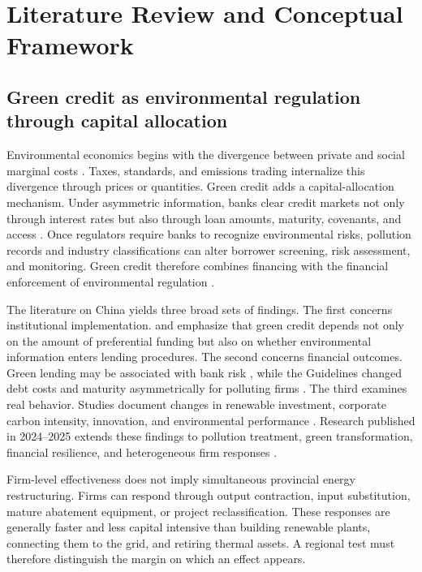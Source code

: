\documentclass[11pt]{article}
\begin{document}
\section{Literature Review and Conceptual Framework}

\subsection{Green credit as environmental regulation through capital allocation}

Environmental economics begins with the divergence between private and social marginal costs \parencite{pigou1920}. Taxes, standards, and emissions trading internalize this divergence through prices or quantities. Green credit adds a capital-allocation mechanism. Under asymmetric information, banks clear credit markets not only through interest rates but also through loan amounts, maturity, covenants, and access \parencite{stiglitzweiss1981}. Once regulators require banks to recognize environmental risks, pollution records and industry classifications can alter borrower screening, risk assessment, and monitoring. Green credit therefore combines financing with the financial enforcement of environmental regulation \parencite{campiglio2016,dikauvolz2021}.

The literature on China yields three broad sets of findings. The first concerns institutional implementation. \textcite{aizawayang2010} and \textcite{zhangyangbi2011} emphasize that green credit depends not only on the amount of preferential funding but also on whether environmental information enters lending procedures. The second concerns financial outcomes. Green lending may be associated with bank risk \parencite{cuietal2018}, while the Guidelines changed debt costs and maturity asymmetrically for polluting firms \parencite{xuli2020}. The third examines real behavior. Studies document changes in renewable investment, corporate carbon intensity, innovation, and environmental performance \parencite{heetal2019,xuyetal2023,wuetal2023}. Research published in 2024--2025 extends these findings to pollution treatment, green transformation, financial resilience, and heterogeneous firm responses \parencite{zhangetal2024green,laietal2024,lietal2024,pengetal2024,machen2025,zhengetal2025,zhangetal2025micro}.

Firm-level effectiveness does not imply simultaneous provincial energy restructuring. Firms can respond through output contraction, input substitution, mature abatement equipment, or project reclassification. These responses are generally faster and less capital intensive than building renewable plants, connecting them to the grid, and retiring thermal assets. A regional test must therefore distinguish the margin on which an effect appears.
\end{document}
